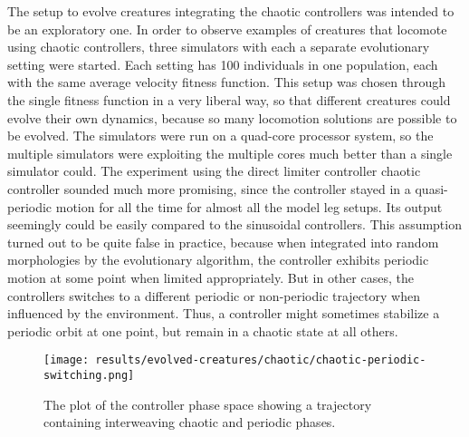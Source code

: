\documentclass[main]{subfiles}
\begin{document}
The setup to evolve creatures integrating the chaotic controllers was intended to be an exploratory one. %
%
In order to observe examples of creatures that locomote using chaotic controllers, three simulators with each a separate evolutionary setting were started. %
%
Each setting has 100 individuals in one population, each with the same average velocity fitness function. %
%
This setup was chosen through the single fitness function in a very liberal way, so that different creatures could evolve their own dynamics, because so many locomotion solutions are possible to be evolved. %
%
The simulators were run on a quad-core processor system, so the multiple simulators were exploiting the multiple cores much better than a single simulator could. %
%
The experiment using the direct limiter controller chaotic controller sounded much more promising, since the controller stayed in a quasi-periodic motion for all the time for almost all the model leg setups. %
%
Its output seemingly could be easily compared to the sinusoidal controllers. %
%
This assumption turned out to be quite false in practice, because when integrated into random morphologies by the evolutionary algorithm, the controller exhibits periodic motion at some point when limited appropriately. %
%
But in other cases, the controllers switches to a different periodic or non-periodic trajectory when influenced by the environment. %
% 
Thus, a controller might sometimes stabilize a periodic orbit at one point, but remain in a chaotic state at all others. %

\begin{figure}[H]
\centering
\texttt{[image: results/evolved-creatures/chaotic/chaotic-periodic-switching.png]}
\caption[Chaotic-periodic phase switching]{The plot of the controller phase space showing a trajectory containing interweaving chaotic and periodic phases.}
\label{figure:z-2.4-3.19-chaotictrajectories}
\end{figure}
\end{document}
